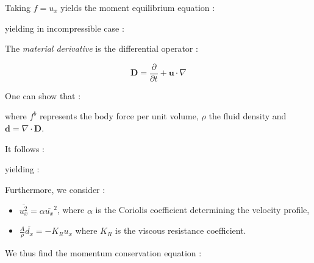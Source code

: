 \documentclass[a4paper]{article}
\begin{document}
\bigskip

\noindent Taking $f=u_x$ yields the moment equilibrium equation :


\noindent yielding in incompressible case :


 The \emph{material derivative} is the differential operator :

$$\mathbf D=\frac{\partial}{\partial t}+\mathbf u\cdot\nabla$$

\noindent One can show that :


\noindent where $f^b$ represents the body force per unit volume, $\rho$ the fluid density and $\mathbf d=\nabla\cdot\mathbf D$.


It follows :


\noindent yielding :


\noindent Furthermore, we consider :
\begin{itemize}
\item $\overline{u_x^2}=\alpha\overline{u_x}^2$, where $\alpha$ is the Coriolis coefficient determining the velocity profile,
\item $\displaystyle \frac A\rho\overline{d_x}=-K_Ru_x$ where $K_R$ is the viscous resistance coefficient.
\end{itemize}

\noindent We thus find the momentum conservation equation :
\end{document}
